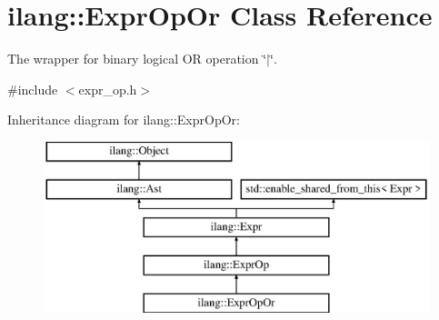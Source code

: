 \hypertarget{classilang_1_1_expr_op_or}{}\section{ilang\+:\+:Expr\+Op\+Or Class Reference}
\label{classilang_1_1_expr_op_or}


The wrapper for binary logical OR operation \char`\"{}$\vert$\char`\"{}.  




{\ttfamily \#include $<$expr\+\_\+op.\+h$>$}

Inheritance diagram for ilang\+:\+:Expr\+Op\+Or\+:\begin{figure}[H]
\begin{center}
\leavevmode
\includegraphics[height=5.000000cm]{classilang_1_1_expr_op_or}
\end{center}
\end{figure}
